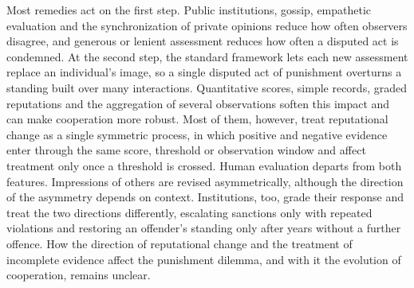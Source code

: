 Most remedies act on the first step. Public institutions, gossip, empathetic evaluation and the synchronization of private opinions reduce how often observers disagree\cite{radzvilavicius2021,kawakatsu2024,radzvilavicius2019,murase2024synchronization,tham2026}, and generous or lenient assessment reduces how often a disputed act is condemned\cite{schmid2021,okada2024}. At the second step, the standard framework lets each new assessment replace an individual's image, so a single disputed act of punishment overturns a standing built over many interactions\cite{ohtsuki2004,hilbe2018}. Quantitative scores, simple records, graded reputations and the aggregation of several observations soften this impact and can make cooperation more robust\cite{schmid2023,clark2020,tanabe2013,murase2022,michelmata2024,yamamoto2025}. Most of them, however, treat reputational change as a single symmetric process, in which positive and negative evidence enter through the same score, threshold or observation window and affect treatment only once a threshold is crossed. Human evaluation departs from both features. Impressions of others are revised asymmetrically, although the direction of the asymmetry depends on context\cite{skowronski1989,slovic1993,mendesiedlecki2013diagnostic,siegel2018}. Institutions, too, grade their response and treat the two directions differently, escalating sanctions only with repeated violations\cite{ostrom1990,cox2010} and restoring an offender's standing only after years without a further offence\cite{blumstein2009}. How the direction of reputational change and the treatment of incomplete evidence affect the punishment dilemma, and with it the evolution of cooperation, remains unclear.
